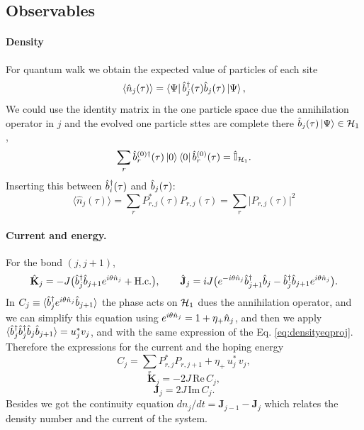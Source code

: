 \documentclass[a4paper, amsfonts, amssymb, amsmath, reprint, showkeys, nofootinbib ,twoside]{revtex4-2}
\begin{document}
\subsection{Observables}
\paragraph{Density} For quantum walk we obtain the expected value of particles of each site
\begin{equation}\label{eq:n}
\langle \hat{n}_j(\tau)\rangle =\bra\Psi\hat b^\dagger_{j}(\tau)\hat b_{j}(\tau)\ket\Psi,
\end{equation} 
We could use the identity matrix in the one particle space due the annihilation operator in $j$ and the evolved one particle sttes are complete there $\hat b_{j}(\tau)\ket\Psi\in\mathcal H_{1}$, 
\begin{equation}
\sum_r\hat b^{(0)\dagger}_r(\tau)\ket0\bra0\hat b^{(0)}_r(\tau)=\hat{\mathbb I}_{\mathcal H_{1}}.
\end{equation}
Inserting this between $\hat b^\dagger_{i}(\tau)$ and $\hat b_{j}(\tau)$: 
\begin{equation}\label{eq:densityeqproj} 
\langle \hat{n}_j(\tau)\rangle =\sum_rP^*_{r,j}(\tau)P_{r,j}(\tau) =\sum_r\big|P_{r,j}(\tau)\big|^2
\end{equation}

\paragraph{Current and energy.} For the bond $(j,j+1)$,
\begin{equation}
\hat{\mathbf K}_j=-J\big(\hat b^\dagger_{j}\hat b_{j+1}e^{i\theta\hat n_{j}}+\mathrm{H.c.}\big),\qquad
\hat{\mathbf J}_j=iJ\big(e^{-i\theta\hat n_{j}}\hat b^\dagger_{j+1}\hat b_{j}-\hat b^\dagger_{j}\hat b_{j+1}e^{i\theta\hat n_{j}}\big).
\end{equation}
In $C_j\equiv\langle\hat b^\dagger_{j}e^{i\theta\hat n_{j}}\hat b_{j+1}\rangle$ the phase acts on $\mathcal H_{1}$ dues the annihilation operator, and we can simplify this equation using $e^{i\theta\hat n_{j}}=1+\eta_+\hat n_{j}$, and then we apply $\langle\hat b^\dagger_{j}\hat b^\dagger_{j}\hat b_{j}\hat b_{j+1}\rangle=u^*_jv_j$, and with the same expression of the Eq. \eqref{eq:densityeqproj}. Therefore the expressions for the current and the hoping energy
\begin{equation}\label{eq:KJ}
C_j=\sum_rP^*_{r,j}P_{r,j+1}+\eta_+\,u^*_j\,v_j,
\end{equation} 
\begin{equation} 
\mathbf K_j=-2J\,\mathrm{Re}\,C_j,
\end{equation}
\begin{equation} 
 \mathbf J_j=2J\,\mathrm{Im}\,C_j.
\end{equation}
Besides we got the continuity equation $dn_j/dt=\mathbf J_{j-1}-\mathbf J_j$ which relates the density number and the current of the system. 
\end{document}
